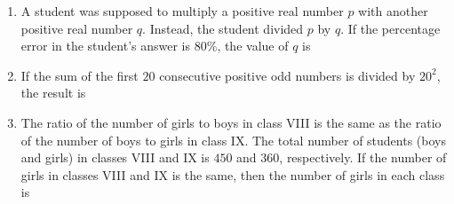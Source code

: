 \documentclass[journal,12pt,onecolumn]{IEEEtran}
\theoremstyle{remark}
\begin{document}
\begin{enumerate}
\item A student was supposed to multiply a positive real number $p$ with another positive real number $q$. Instead, the student divided $p$ by $q$. If the percentage error in the student's answer is $80\%$, the value of $q$ is
\par\hfill{}
    \begin{enumerate}
    \end{enumerate}

\item If the sum of the first $20$ consecutive positive odd numbers is divided by $20^2$, the result is
\par\hfill{}
    \begin{enumerate}
    \end{enumerate}

\item The ratio of the number of girls to boys in class VIII is the same as the ratio of the number of boys to girls in class IX. The total number of students (boys and girls) in classes VIII and IX is $450$ and $360$, respectively. If the number of girls in classes VIII and IX is the same, then the number of girls in each class is
\par\hfill{}
    \begin{enumerate}
    \end{enumerate}


\end{enumerate}
\end{document}
